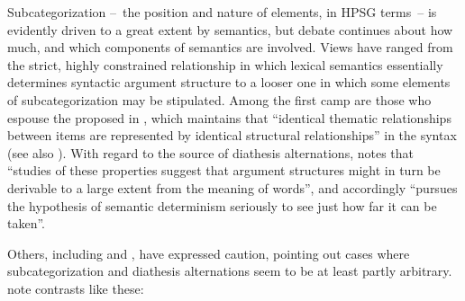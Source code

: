 \documentclass[output=paper
 	        ,biblatex
                ,babelshorthands
                ,newtxmath
                ,draftmode
                ,colorlinks, citecolor=brown
]{langscibook}
\begin{document}
Subcategorization --~the position and nature of \argst elements, in HPSG terms~-- is evidently driven to a great extent by semantics,
but debate continues about how much, and which components of semantics are involved.
Views have ranged from the strict, highly constrained relationship in which lexical semantics essentially determines syntactic argument structure to a looser one in which some elements of subcategorization may be stipulated.
Among  the first camp are those who espouse the   proposed in \citet[46]{Baker1988}, which maintains that ``identical thematic relationships between items are represented by identical structural relationships'' in the syntax (see also \citealt{Baker1997}).
With regard to the source of diathesis alternations,
\citet[12--13]{Levin1993} notes that ``studies of these properties suggest that argument structures
might in turn be derivable to a large extent from the meaning of words'', and accordingly ``pursues
the hypothesis of semantic determinism seriously to see just how far it can be taken''. 

Others, including \citet[Section~5.3]{pollard+sag:1987} and \citet[Section~5.1]{Davis2001}, have
expressed caution, pointing out cases where subcategorization and diathesis
alternations seem to be at least partly arbitrary. \citet[ex.\ 214--215]{pollard+sag:1987} note contrasts like these:
\end{document}
